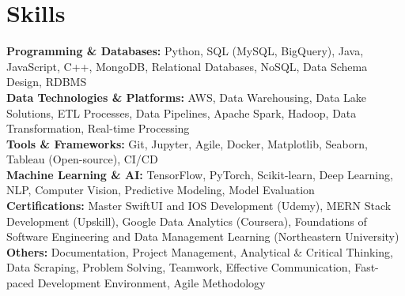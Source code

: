 \documentclass[a4paper,10pt]{article}
\begin{document}
\section*{Skills}
\textbf{Programming \& Databases: } Python, SQL (MySQL, BigQuery), Java, JavaScript, C++, MongoDB, Relational Databases, NoSQL, Data Schema Design, RDBMS \\
\textbf{Data Technologies \& Platforms:} AWS, Data Warehousing, Data Lake Solutions, ETL Processes, Data Pipelines, Apache Spark, Hadoop, Data Transformation, Real-time Processing \\
\textbf{Tools \& Frameworks:}   Git, Jupyter, Agile, Docker, Matplotlib, Seaborn, Tableau (Open-source), CI/CD \\
\textbf{Machine Learning \& AI: } TensorFlow, PyTorch, Scikit-learn, Deep Learning, NLP, Computer Vision, Predictive Modeling, Model Evaluation  \\
\textbf{Certifications:} Master SwiftUI and IOS Development (Udemy), MERN Stack Development (Upskill), Google Data Analytics (Coursera), Foundations of Software Engineering and Data Management Learning (Northeastern University) \\
\textbf{Others: }Documentation, Project Management, Analytical \& Critical Thinking, Data Scraping, Problem Solving, Teamwork, Effective Communication, Fast-paced Development Environment, Agile Methodology \\

\vspace{-4mm}
\end{document}
